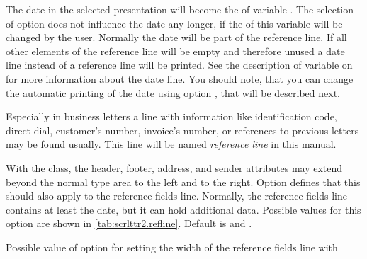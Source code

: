 \begin{Declaration}
\end{Declaration}
%
The date in the selected presentation will become the  of
variable . The selection of option 
does not influence the date any longer, if the  of this variable
will be changed by the user. Normally the date will be part of the reference
line. If all other elements of the reference line will be empty and therefore
unused a date line instead of a reference line will be printed. See the
description of variable  on
 for more information about
the date line. You should note, that you can change the automatic printing of
the date using option , that will be described next.
%
%
%


\begin{Declaration}
\end{Declaration}
%
%
%
Especially in business letters a line with information like identification
code, direct dial, customer's number, invoice's
number, or references to previous letters may be found usually. This line will
be named \emph{reference line} in this manual.

With the  class, the header, footer, address, and sender
attributes may extend beyond the normal type area to the left and to the
right. Option  defines that this should also apply to
the reference fields line. Normally, the reference fields line contains at
least the date, but it can hold additional data. Possible values for this
option are shown in \autoref{tab:scrlttr2.refline}. Default is 
and .%
%
\begin{table}
  \caption[{Possible value of option  with
    }]{Possible value of option  for setting
    the width of the reference fields line with
    }
  \label{tab:scrlttr2.refline}
  \begin{desctabular}
  \end{desctabular}
\end{table}

